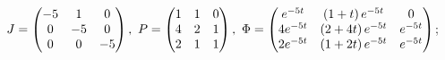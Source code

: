 \begin{enumsolsfull}
		\item \( J = \begin{pmatrix} -5 & 1 & 0 \\ 0 & -5 & 0 \\ 0 & 0 & -5 \end{pmatrix}, ~ P = \begin{pmatrix} 1 & 1 & 0 \\ 4 & 2 & 1 \\ 2 & 1 & 1 \end{pmatrix}, ~ \Phi = \begin{pmatrix} e^{-5t} & \left( 1 + t \right) e^{-5t} & 0 \\ 4e^{-5t} & \left( 2 + 4t \right) e^{-5t} & e^{-5t} \\ 2e^{-5t} & \left( 1 + 2t \right) e^{-5t} & e^{-5t} \end{pmatrix} \); %

\end{enumsolsfull}

